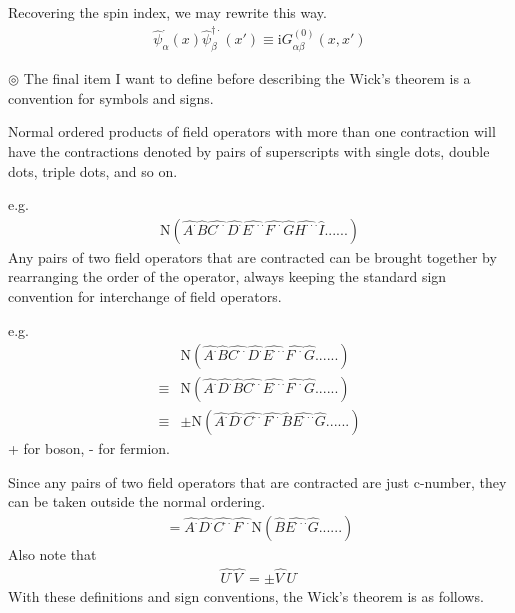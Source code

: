 Recovering the spin index, we may rewrite this way.
\begin{align}\label{2.4.6}
\hat \psi^{\cdot}_{\alpha}(x)\hat \psi^{\dagger\cdot}_{\beta}(x')\equiv \mathrm{i}G_{\alpha\beta}^{(0)}(x,x')
\end{align}

$\circledcirc$ The final item I want to define before describing the Wick's theorem is a convention for symbols and signs.

Normal ordered products of field operators with more than one contraction will have the contractions denoted by pairs of superscripts with single dots, double dots, triple dots, and so on.

e.g.
\begin{align}
\mathrm{N}(\hat{A^{\cdot}}\hat{B}\hat{C^{\cdot\cdot}}\hat{D^{\cdot}}\hat{E^{\cdot\cdot\cdot}}\hat{F^{\cdot\cdot}}\hat{G}\hat{H^{\cdot\cdot\cdot}}\hat{I}......)\nonumber
\end{align}
Any pairs of two field operators that are contracted can be brought together by rearranging the order of the operator, always keeping the standard sign convention for interchange of field operators.

e.g.
\begin{align}
&\mathrm{N}(\hat{A^{\cdot}}\hat{B}\hat{C^{\cdot\cdot}}\hat{D^{\cdot}}\hat{E^{\cdot\cdot\cdot}}\hat{F^{\cdot\cdot}}\hat{G}......)\nonumber \\
\equiv&\mathrm{N}(\hat{A^{\cdot}}\hat{D^{\cdot}}\hat{B}\hat{C^{\cdot\cdot}}\hat{E^{\cdot\cdot\cdot}}\hat{F^{\cdot\cdot}}\hat{G}......)\nonumber \\
\equiv&\pm\mathrm{N}(\hat{A^{\cdot}}\hat{D^{\cdot}}\hat{C^{\cdot\cdot}}\hat{F^{\cdot\cdot}}\hat{B}\hat{E^{\cdot\cdot\cdot}}\hat{G}......)\nonumber 
\end{align}
+ for boson, - for fermion.

Since any pairs of two field operators that are contracted are just c-number, they can be taken outside the normal ordering.
\begin{align}
=\hat{A^{\cdot}}\hat{D^{\cdot}}\hat{C^{\cdot\cdot}}\hat{F^{\cdot\cdot}}\mathrm{N}(\hat{B}\hat{E^{\cdot\cdot\cdot}}\hat{G}......)\nonumber 
\end{align}
Also note that
\begin{align}
\hat{U^{\cdot}}\hat{V^{\cdot}}=\pm\hat{V^{\cdot}}\hat{U^{\cdot}} \nonumber
\end{align}
With these definitions and sign conventions, the Wick's theorem is as follows.


